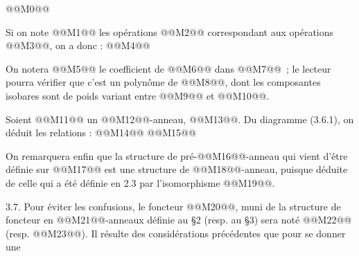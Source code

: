 
@@M0@@

Si on note @@M1@@ les opérations @@M2@@ correspondant aux opérations @@M3@@, on a donc :
@@M4@@

On notera @@M5@@ le coefficient de @@M6@@ dans @@M7@@~; le lecteur pourra vérifier que c'est un polynôme de @@M8@@, dont les composantes isobares sont de poids variant entre @@M9@@ et @@M10@@.

Soient @@M11@@ un @@M12@@-anneau, @@M13@@. Du diagramme (3.6.1), on déduit les relations :
@@M14@@
@@M15@@

On remarquera enfin que la structure de pré-@@M16@@-anneau qui vient d'être définie sur @@M17@@ est une structure de @@M18@@-anneau, puisque déduite de celle qui a été définie en 2.3 par l'isomorphisme @@M19@@.

3.7. Pour éviter les confusions, le foncteur @@M20@@, muni de la structure de foncteur en @@M21@@-anneaux définie au §2 (resp. au §3) sera noté @@M22@@ (resp. @@M23@@). Il résulte des considérations précédentes que pour se donner une
